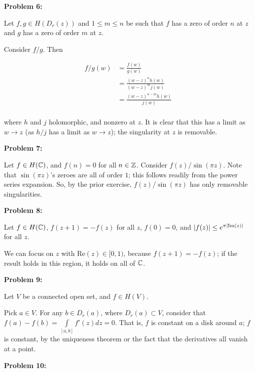 \documentclass[a4paper,12pt]{article}
\begin{document}
\shunt

{\bf Problem 6:}

Let $f, g \in H(D_r(z))$ and $1 \leq m \leq n$ be such that $f$ has a zero of order $n$ at $z$ and $g$ has a zero of order $m$ at $z$.

Consider $f/g$. Then

\begin{align*}
f/g(w) &= \frac{f(w)}{g(w)}\\
&= \frac{(w-z)^nh(w)}{(w-z)^mj(w)}\\
&= \frac{(w-z)^{n-m}h(w)}{j(w)}\\
\end{align*}

where $h$ and $j$ holomorphic, and nonzero at $z$. It is clear that this has a limit as $w \to z$ (as $h/j$ has a limit as $w \to z$); the singularity at $z$ is removable.  

\shunt

{\bf Problem 7:}

Let $f \in H(\mathbb{C})$, and $f(n) = 0$ for all $n \in \mathbb{Z}$. Consider $f(z)/\sin(\pi z)$. Note that $\sin(\pi z)$'s zeroes are all of order $1$; this follows readily from the power series expansion. So, by the prior exercise, $f(z)/\sin(\pi z)$ has only removable singularities.


\shunt

{\bf Problem 8:}

Let $f \in H(\mathbb{C})$, $f(z+1) = -f(z)$ for all $z$, $f(0) = 0$, and $\left\lvert f(z) \right\rvert \leq e^{\pi \left\lvert \text{Im}(z) \right\rvert}$ for all $z$.

We can focus on $z$ with $\text{Re}(z) \in [0,1)$, because $f(z+1) = -f(z)$; if the result holds in this region, it holds on all of $\mathbb{C}$. %

\shunt

{\bf Problem 9:}

Let $V$ be a connected open set, and $f \in H(V)$.

Pick $a \in V$. For any $b \in D_r(a)$, where $D_r(a) \subset V$, consider that $f(a)-f(b) = \int\limits_{[a,b]} f'(z) dz = 0$. That is, $f$ is constant on a disk around $a$; $f$ is constant, by the uniqueness theorem or the fact that the derivatives all vanish at a point. 

\shunt

{\bf Problem 10:}
\end{document}
